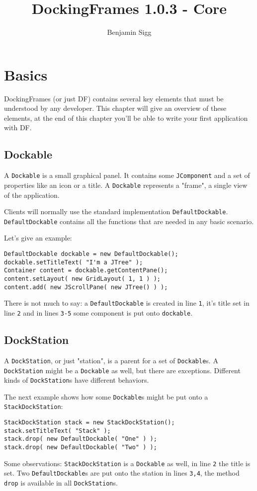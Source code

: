 \documentclass[a4paper,10pt]{article}
\title{DockingFrames 1.0.3 - Core}
\author{Benjamin Sigg}
\newcommand{\src}[1]{\lstinline[basicstyle=\normalsize\ttfamily,keywordstyle=\normalsize\ttfamily,identifierstyle=\normalsize\ttfamily]|#1|}
\begin{document}
\maketitle
\tableofcontents
\newpage


\begin{abstract}
\end{abstract}

\section{Basics}
DockingFrames (or just DF) contains several key elements that must be understood by any developer. This chapter will give an overview of these elements, at the end of this chapter you'll be able to write your first application with DF.

\subsection{Dockable}
A \src{Dockable} is a small graphical panel. It contains some \src{JComponent} and a set of properties like an icon or a title. A \src{Dockable} represents a "frame", a single view of the application.

Clients will normally use the standard implementation \src{DefaultDockable}. \src{DefaultDockable} contains all the functions that are needed in any basic scenario.

Let's give an example:
\begin{lstlisting}
DefaultDockable dockable = new DefaultDockable();
dockable.setTitleText( "I'm a JTree" );
Container content = dockable.getContentPane();
content.setLayout( new GridLayout( 1, 1 ) );
content.add( new JScrollPane( new JTree() ) );
\end{lstlisting}
There is not much to say: a \src{DefaultDockable} is created in line \src{1}, it's title set in line \src{2} and in lines \src{3-5} some component is put onto \src{dockable}.

\subsection{DockStation}
A \src{DockStation}, or just "station", is a parent for a set of \src{Dockable}s. A \src{DockStation} might be a \src{Dockable} as well, but there are exceptions. Different kinds of \src{DockStation}s have different behaviors.

The next example shows how some \src{Dockable}s might be put onto a \\\src{StackDockStation}:
\begin{lstlisting}
StackDockStation stack = new StackDockStation();
stack.setTitleText( "Stack" );
stack.drop( new DefaultDockable( "One" ) );
stack.drop( new DefaultDockable( "Two" ) );
\end{lstlisting}
Some observations: \src{StackDockStation} is a \src{Dockable} as well, in line \src{2} the title is set. Two \src{DefaultDockable}s are put onto the station in lines \src{3,4}, the method \src{drop} is available in all \src{DockStation}s.
\end{document}
